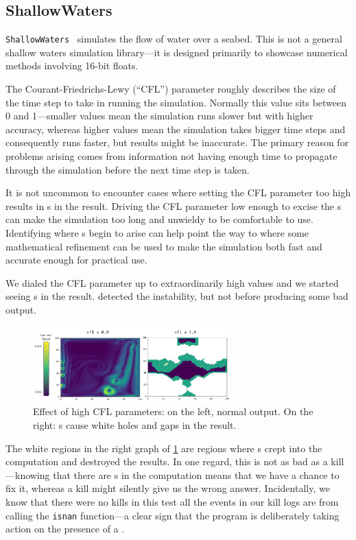 \documentclass{juliacon}
\begin{document}
\subsection{ShallowWaters}
\label{s:sw}

\texttt{ShallowWaters}~\cite{klowerNumberFormatsError2020,klowerPositsAlternativeFloats2019,klowerLowprecisionClimateComputing2021} simulates the flow of water over a seabed.
This is not a general shallow waters simulation library---it is designed primarily to showcase numerical methods involving 16-bit floats.

The Courant-Friedrichs-Lewy (``CFL'') parameter roughly describes the size of the time step to take in running the simulation.
Normally this value sits between 0 and 1---smaller values mean the simulation runs slower but with higher accuracy, whereas higher values mean the simulation takes bigger time steps and consequently runs faster, but results might be inaccurate.
The primary reason for problems arising comes from information not having enough time to propagate through the simulation before the next time step is taken.

It is not uncommon to encounter cases where setting the CFL parameter too high results in \NaN{}s in the result.
Driving the CFL parameter low enough to excise the \NaN{}s can make the simulation too long and unwieldy to be comfortable to use.
Identifying where \NaN{}s begin to arise can help point the way to where some mathematical refinement can be used to make the simulation both fast and accurate enough for practical use.

We dialed the CFL parameter up to extraordinarily high values and we started seeing \NaN{}s in the result.
 detected the instability, but not before producing some bad output.

\begin{figure}[ht]
  \centering
  \includegraphics[width=3in]{./fig/shallow_waters_cfl_diff.png}
  \caption{Effect of high CFL parameters: on the left, normal output. On the right: \NaN{}s cause white holes and gaps in the result.}
  \label{fig:sw_nans}
\end{figure}

The white regions in the right graph of \cref{fig:sw_nans} are regions where \NaN{}s crept into the computation and destroyed the results.
In one regard, this is not as bad as a \NaN{} kill---knowing that there are \NaN{}s in the computation means that we have a chance to fix it, whereas a \NaN{} kill might silently give us the wrong answer.
Incidentally, we know that there were no \NaN{} kills in this test all the events in our kill logs are from calling the \texttt{isnan} function---a clear sign that the program is deliberately taking action on the presence of a \NaN{}.
\end{document}
